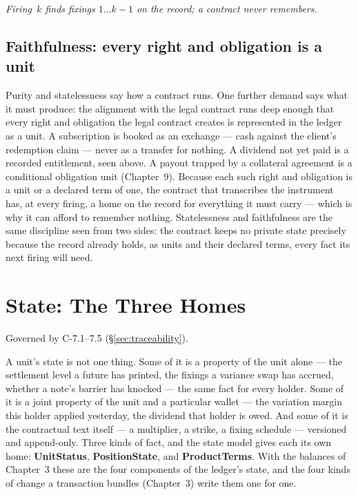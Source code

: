 \documentclass[11pt,a4paper]{article}
\begin{document}
\emph{Firing~$k$ finds fixings $1 \ldots k-1$ on the record; a contract never
remembers.}

\subsection{Faithfulness: every right and obligation is a unit}

Purity and statelessness say how a contract runs. One further demand says what it
must produce: the alignment with the legal contract runs deep enough that every
right and obligation the legal contract creates is represented in the ledger as
a unit. A subscription is booked as an exchange --- cash against the client's
redemption claim --- never as a transfer for nothing. A dividend not yet paid is
a recorded entitlement, seen above. A payout trapped by a collateral agreement
is a conditional obligation unit (Chapter~9). Because each such right and
obligation is a unit or a declared term of one, the contract that transcribes
the instrument has, at every firing, a home on the record for everything it must
carry --- which is why it can afford to remember nothing. Statelessness and
faithfulness are the same discipline seen from two sides: the contract keeps no
private state precisely because the record already holds, as units and their
declared terms, every fact its next firing will need.

\section{State: The Three Homes}\label{ch:homes}

Governed by C-7.1--7.5 (\S\ref{sec:traceability}).

A unit's state is not one thing. Some of it is a property of the unit alone --- the
settlement level a future has printed, the fixings a variance swap has accrued, whether a
note's barrier has knocked --- the same fact for every holder. Some of it is a joint
property of the unit and a particular wallet --- the variation margin this holder applied
yesterday, the dividend that holder is owed. And some of it is the contractual text
itself --- a multiplier, a strike, a fixing schedule --- versioned and append-only. Three
kinds of fact, and the state model gives each its own home: \textbf{UnitStatus},
\textbf{PositionState}, and \textbf{ProductTerms}. With the balances of Chapter~3
these are the four components of the ledger's state, and the four kinds of change a
transaction bundles (Chapter~3) write them one for one.
\end{document}
